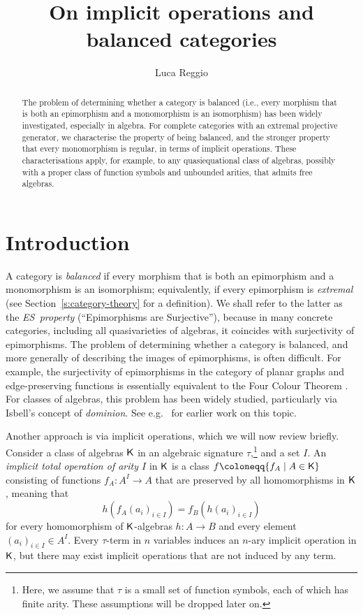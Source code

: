 \documentclass[a4paper,10pt,reqno]{amsart}
\title{On implicit operations and balanced categories}
\author{Luca Reggio}
\theoremstyle{definition}
\theoremstyle{remark}
\newcommand{\K}{{\sf K}}								%
\newcommand{\ES}{\textnormal{ES}}
\begin{document}
\begin{abstract}
The problem of determining whether a category is balanced (i.e., every morphism that is both an epimorphism and a monomorphism is an isomorphism) has been widely investigated, especially in algebra.
For complete categories with an extremal projective generator, we characterise the property of being balanced, and the stronger property that every monomorphism is regular, in terms of implicit operations. These characterisations apply, for example, to any quasiequational class of algebras, possibly with a proper class of function symbols and unbounded arities, that admits free algebras.
\end{abstract}


\maketitle


\section{Introduction}\label{s:introduction}
A category is \emph{balanced} if every morphism that is both an epimorphism and a monomorphism is an isomorphism; equivalently, if every epimorphism is \emph{extremal} (see Section~\ref{s:category-theory} for a definition). We shall refer to the latter as the \emph{\ES~property} (``Epimorphisms are Surjective''), because in many concrete categories, including all quasivarieties of algebras, it coincides with surjectivity of epimorphisms. The problem of determining whether a category is balanced, and more generally of describing the images of epimorphisms, is often difficult. For example, the surjectivity of epimorphisms in the category of planar graphs and edge-preserving functions is essentially equivalent to the Four Colour Theorem \cite{Fawcett1986}. For classes of algebras, this problem has been widely studied, particularly via Isbell's concept of \emph{dominion}. See e.g.\ \cite{Isbell1966,HI1967,Storrer1968} for earlier work on this topic.


Another approach is via implicit operations, which we will now review briefly.
%
Consider a class of algebras $\K$ in an algebraic signature $\tau$,\footnote{Here, we assume that $\tau$ is a small set of function symbols, each of which has finite arity. These assumptions will be dropped later on.} and a set $I$. An \emph{implicit total operation of arity $I$} in $\K$ is a class $f\coloneqq \{f_{A}\mid A\in \K\}$ consisting of functions $f_{A}\colon A^{I}\to A$ that are preserved by all homomorphisms in $\K$, meaning that
\[
h(f_{A}(a_{i})_{i\in I}) = f_{B}(h(a_{i})_{i\in I})
\]
for every homomorphism of $\K$-algebras $h\colon A\to B$ and every element $(a_{i})_{i\in I}\in A^{I}$. Every $\tau$-term in $n$ variables induces an $n$-ary implicit operation in $\K$, but there may exist implicit operations that are not induced by any term. 
%
\end{document}
